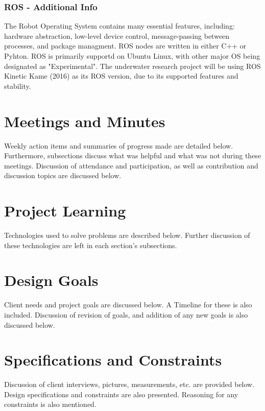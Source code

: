 \documentclass[12pt]{article}
\begin{document}
		\subsubsection{ROS - Additional Info}
		The Robot Operating System contains many essential features, including: hardware abstraction, low-level device control, message-passing between processes, and package managment. ROS nodes are written in either C++ or Pyhton. ROS is primarily supportd on Ubuntu Linux, with other major OS being designated as "Experimental". The underwater research project will be using ROS Kinetic Kame (2016) as its ROS version, due to its supported features and stability. 
		
		\newpage
	
	\section{Meetings and Minutes}
	Weekly action items and summaries of progress made are detailed below. Furthermore, subsections discuss what was helpful and what was not during these meetings. Discussion of attendance and participation, as well as contribution and discussion topics are discussed below.

		\newpage

	\section{Project Learning}
	Technologies used to solve problems are described below. Further discussion of these technologies are left in each section's subsections.

		\newpage
		
	\section{Design Goals}
	Client needs and project goals are discussed below. A Timeline for these is also included. Discussion of revision of goals, and addition of any new goals is also discussed below.
	
		\newpage	
	
	\section{Specifications and Constraints}
	Discussion of client interviews, pictures, measurements, etc. are provided below. Design specifications and constraints are also presented. Reasoning for any constraints is also mentioned.
	
\end{document}
